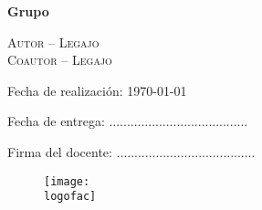 
\begin{titlepage}
\centering

{ \large \universidad \par }
\vspace{2cm}
{\Large \scshape \materia \par}
\vspace{2cm}
{\Huge \scshape \titulo \par }
\vspace{1cm}
{\large \bf Grupo \grupo \par}
\vspace{0cm}
\textsc{\large Autor -- Legajo \\ Coautor -- Legajo}
\vspace{2cm}
{\par \large Fecha de realización: \today \par}
\vspace{1cm}
{\large Fecha de entrega: .......................................\par}
\vspace{1.5cm}
{\large Firma del docente: .......................................}
\vspace{2.5cm}
\begin{figure}[htb!]
\centering
\texttt{[image: \\logofac]}
\end{figure}
\end{titlepage}